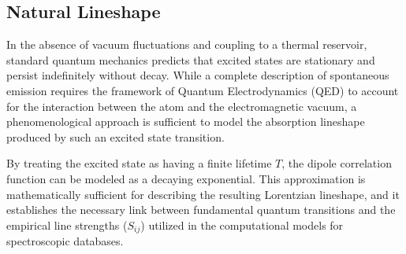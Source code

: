\documentclass[12pt]{report}
\begin{document}
	
	\subsection{Natural Lineshape}
	In the absence of vacuum fluctuations and coupling to a thermal reservoir, standard quantum mechanics predicts that excited states are stationary and persist indefinitely without decay. While a complete description of spontaneous emission requires the framework of Quantum Electrodynamics (QED) to account for the interaction between the atom and the electromagnetic vacuum, a phenomenological approach is sufficient to model the absorption lineshape produced by such an excited state transition.
	
	By treating the excited state as having a finite lifetime $T$, the dipole correlation function can be modeled as a decaying exponential. This approximation is mathematically sufficient for describing the resulting Lorentzian lineshape, and it establishes the necessary link between fundamental quantum transitions and the empirical line strengths ($S_{ij}$) utilized in the computational models for spectroscopic databases.
	
\end{document}
